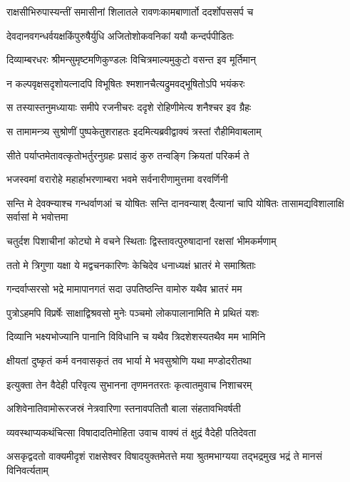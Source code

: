 \twolineshloka
{राक्षसीभिरुपास्यन्तीं समासीनां शिलातले}
{रावणःकामबाणार्तो ददर्शोपससर्प च}


\twolineshloka
{देवदानवगन्धर्वयक्षकिंपुरुषैर्युधि}
{अजितोशोकवनिकां ययौ कन्दर्पपीडितः}


\twolineshloka
{दिव्याम्बरधरः श्रीमन्सुमृष्टमणिकुण्डलः}
{विचित्रमाल्यमुकुटो वसन्त इव मूर्तिमान्}


\twolineshloka
{न कल्पवृक्षसदृशोयत्नादपि विभूषितः}
{श्मशानचैत्यद्रुमवद्भूषितोऽपि भयंकरः}


\twolineshloka
{स तस्यास्तनुमध्यायाः समीपे रजनीचरः}
{ददृशे रोहिणीमेत्य शनैश्चर इव ग्रैहः}


\twolineshloka
{स तामामन्त्र्य सुश्रोणीं पुष्पकेतुशराहतः}
{इदमित्यब्रवीद्वाक्यं त्रस्तां रौहीमिवाबलाम्}


\twolineshloka
{सीते पर्याप्तमेतावत्कृतोभर्तुरनुग्रहः}
{प्रसादं कुरु तन्वङ्गि क्रियतां परिकर्म ते}


\twolineshloka
{भजस्वमां वरारोहे महार्हाभरणाम्बरा}
{भवमे सर्वनारीणामुत्तमा वरवर्णिनी}


\threelineshloka
{सन्ति मे देवक्न्याश्च गन्धर्वाणआं च योषितः}
{सन्ति दानवन्याश् दैत्यानां चापि योषितः}
{तासामद्यविशालाक्षि सर्वासां मे भवोत्तमा}


\twolineshloka
{चतुर्दश पिशाचीनां कोट्यो मे वचने स्थिताः}
{द्विस्तावत्पुरुषादानां रक्षसां भीमकर्मणाम्}


\twolineshloka
{ततो मे त्रिगुणा यक्षा ये मद्वचनकारिणः}
{केचिदेव धनाध्यक्षं भ्रातरं मे समाश्रिताः}


\twolineshloka
{गन्दर्वाप्सरसो भद्रे मामापानगतं सदा}
{उपतिष्ठन्ति वामोरु यथैव भ्रातरं मम}


\twolineshloka
{पुत्रोऽहमपि विप्रर्षेः साक्षाद्विश्रवसो मुनेः}
{पञ्चमो लोकपालानामिति मे प्रथितं यशः}


\twolineshloka
{दिव्यानि भक्ष्यभोज्यानि पानानि विविधानि च}
{यथैव त्रिदशेशस्यतथैव मम भामिनि}


\twolineshloka
{क्षीयतां दुष्कृतं कर्म वनवासकृतं तव}
{भार्या मे भवसुश्रोणि यथा मण्डोदरीतथा}


\twolineshloka
{इत्युक्ता तेन वैदेही परिवृत्य सुभानना}
{तृणमनतरतः कृत्वातमुवाच निशाचरम्}


\twolineshloka
{अशिवेनातिवामोरूरजस्रं नेत्रवारिणा}
{स्तनावपतितौ बाला संहतावभिवर्षती}


\twolineshloka
{व्यवस्थाप्यकथंचित्सा विषादादतिमोहिता}
{उवाच वाक्यं तं क्षुद्रं वैदेही पतिदेवता}


\threelineshloka
{असकृद्वदतो वाक्यमीदृशं राक्षसेश्वर}
{विषादयुक्तमेतत्ते मया श्रुतमभाग्यया}
{तद्भद्रमुख भद्रं ते मानसं विनिवर्त्यताम्}


